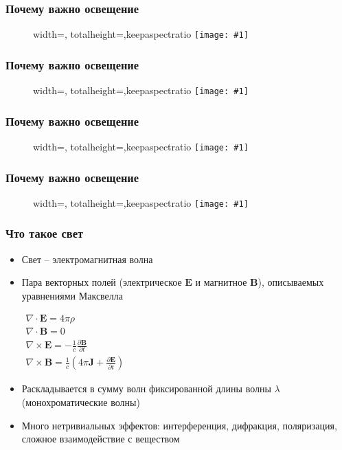 \documentclass{beamer}
\newcommand{\slideimage}[1]{
  \begin{figure}
    \begin{adjustbox}{width=\textwidth, totalheight=\textheight-2\baselineskip-2\baselineskip,keepaspectratio}
      \texttt{[image: \#1]}
    \end{adjustbox}
  \end{figure}
}
\begin{document}

\begin{frame}[fragile]
\frametitle{Почему важно освещение}
\slideimage{suzanne-material.png}
\end{frame}


\begin{frame}[fragile]
\frametitle{Почему важно освещение}
\slideimage{zelda.png}
\end{frame}


\begin{frame}[fragile]
\frametitle{Почему важно освещение}
\slideimage{win31.png}
\end{frame}

\begin{frame}[fragile]
\frametitle{Почему важно освещение}
\slideimage{zelda2.jpg}
\end{frame}


\begin{frame}[fragile]
\frametitle{Что такое свет}
\begin{itemize}
\item Свет -- электромагнитная волна
\item Пара векторных полей (электрическое \begin{math}\mathbf{E}\end{math} и магнитное \begin{math}\mathbf{B}\end{math}), описываемых уравнениями Максвелла
\begin{center}
\begin{math}
\begin{matrix}
\nabla \cdot \mathbf{E} = 4 \pi \rho \\
\nabla \cdot \mathbf{B} = 0 \\
\nabla \times \mathbf{E} = -\frac{1}{c} \frac{\partial \mathbf B}{\partial t} \\
\nabla \times \mathbf{B} = \frac{1}{c} \left(4 \pi \mathbf J + \frac{\partial \mathbf E}{\partial t} \right)
\end{matrix}
\end{math}
\end{center}
\pause
\item Раскладывается в сумму волн фиксированной длины волны \begin{math}\lambda\end{math} (монохроматические волны)
\item Много нетривиальных эффектов: интерференция, дифракция, поляризация, сложное взаимодействие с веществом
\end{itemize}
\end{frame}
\end{document}
